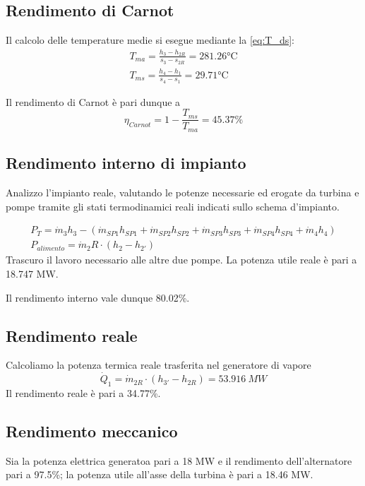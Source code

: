 \subsection{Rendimento di Carnot}
Il calcolo delle temperature medie si esegue mediante la \eqref{eq:T_ds}: 
\begin{align*}
    T_{ma} = \frac{h_3-h_{2R}}{s_3-s_{2R}} = 281.26 \text{°C} \\
    T_{ms} = \frac{h_4-h_1}{s_4-s_1} = 29.71 \text{°C}
\end{align*}

Il rendimento di Carnot è pari dunque a 
\begin{equation*}
    \eta_{Carnot} = 1 - \frac{T_{ms}}{T_{ma}} = 45.37\%
\end{equation*}

\subsection{Rendimento interno di impianto}
Analizzo l'impianto reale, valutando le potenze necessarie ed erogate da turbina e pompe tramite gli stati termodinamici reali indicati sullo schema d'impianto.

\begin{align*}
    P_T = \dot m_3 h_3 - (\dot m_{SP1}h_{SP1}+ \dot m_{SP2}h_{SP2}+ \dot m_{SP3}h_{SP3}+ \dot m_{SP4}h_{SP4}+ \dot m_4h_4) \\
    P_{alimento} = \dot m_2R \cdot (h_2 - h_{2'})
\end{align*}
Trascuro il lavoro necessario alle altre due pompe.
La potenza utile reale è pari a 18.747 MW.

Il rendimento interno vale dunque 80.02\%.

\subsection{Rendimento reale}
Calcoliamo la potenza termica reale trasferita nel generatore di vapore
\begin{equation*}
    \dot Q_1 = \dot m_{2R} \cdot (h_{3'} - h_{2R}) = 53.916\ MW
\end{equation*}
Il rendimento reale è pari a 34.77\%.

\subsection{Rendimento meccanico}
Sia la potenza elettrica generatoa pari a 18 MW e il rendimento dell'alternatore pari a 97.5\%; la potenza utile all'asse della turbina è pari a 18.46 MW.

